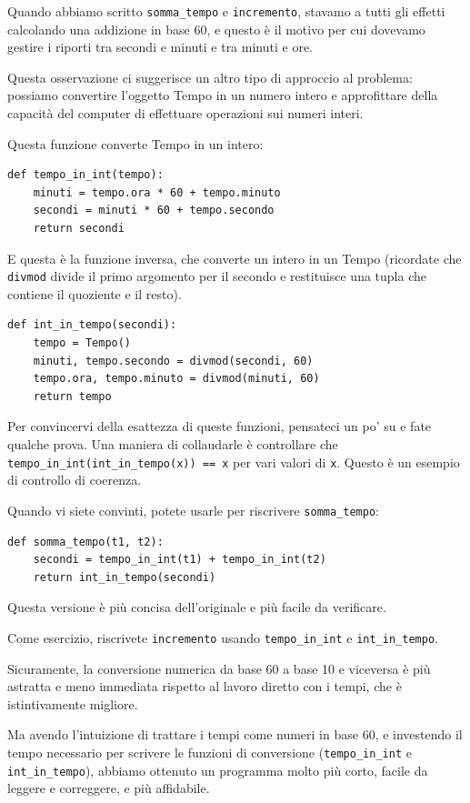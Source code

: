 \documentclass[10pt]{book}
\begin{document}
Quando abbiamo scritto \verb"somma_tempo" e {\tt incremento}, stavamo a tutti gli effetti calcolando una addizione in base 60, e questo è il motivo per cui dovevamo gestire i riporti tra secondi e minuti e tra minuti e ore.

Questa osservazione ci suggerisce un altro tipo di approccio al problema: possiamo convertire l'oggetto Tempo in un numero intero e approfittare della capacità del computer di effettuare operazioni sui numeri interi.

Questa funzione converte Tempo in un intero:

\begin{verbatim}
def tempo_in_int(tempo):
    minuti = tempo.ora * 60 + tempo.minuto
    secondi = minuti * 60 + tempo.secondo
    return secondi
\end{verbatim}
%
E questa è la funzione inversa, che converte un intero in un Tempo (ricordate che {\tt divmod} divide il primo argomento per il secondo e restituisce una tupla che contiene il quoziente e il resto).

\begin{verbatim}
def int_in_tempo(secondi):
    tempo = Tempo()
    minuti, tempo.secondo = divmod(secondi, 60)
    tempo.ora, tempo.minuto = divmod(minuti, 60)
    return tempo
\end{verbatim}
%
Per convincervi della esattezza di queste funzioni, pensateci un po' su e fate qualche prova. Una maniera di collaudarle è controllare che \verb"tempo_in_int(int_in_tempo(x)) == x" per vari valori di {\tt x}. Questo è un esempio di controllo di coerenza.

Quando vi siete convinti, potete usarle per riscrivere \verb"somma_tempo":

\begin{verbatim}
def somma_tempo(t1, t2):
    secondi = tempo_in_int(t1) + tempo_in_int(t2)
    return int_in_tempo(secondi)
\end{verbatim}
%
Questa versione è più concisa dell'originale e più facile da verificare.

Come esercizio, riscrivete {\tt incremento} usando \verb"tempo_in_int" e \verb"int_in_tempo".

Sicuramente, la conversione numerica da base 60 a base 10 e viceversa è più astratta e meno immediata rispetto al lavoro diretto con i tempi, che è istintivamente migliore.

Ma avendo l'intuizione di trattare i tempi come numeri in base 60, e    investendo il tempo necessario per scrivere le funzioni di conversione (\verb"tempo_in_int" e \verb"int_in_tempo"), abbiamo ottenuto un programma molto più corto, facile da leggere e correggere, e più affidabile.
\end{document}
